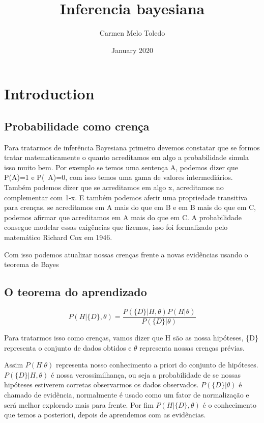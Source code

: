 \documentclass{article}
\title{Inferencia bayesiana}
\author{Carmen Melo Toledo}
\date{January 2020}
\begin{document}
\maketitle

\section{Introduction}

\subsection{Probabilidade como crença}

Para tratarmos de inferência Bayesiana primeiro devemos constatar que se formos tratar matematicamente o quanto acreditamos em algo a probabilidade simula isso muito bem.
Por exemplo se temos uma sentença A, podemos dizer que P(A)=1 e P(~A)=0, com isso temos uma gama de valores intermediários. 
Também podemos dizer que se acreditamos em algo x, acreditamos no complementar com 1-x. E também podemos aferir uma propriedade transitiva para crenças, se acreditamos em A mais do que em B e em B mais do que em C, podemos afirmar que acreditamos em A mais do que em C.
A probabilidade consegue modelar essas exigências que fizemos, isso foi formalizado pelo matemático Richard Cox em 1946.

Com isso podemos atualizar nossas crenças frente a novas evidências usando o teorema de Bayes

\subsection{O teorema do aprendizado}

\begin{equation}
    P(H|\{D\},\theta) = \frac{P(\{D\}|H,\theta) P(H|\theta)}{P(\{D\}|\theta)}
\end{equation}

Para tratarmos isso como crenças, vamos dizer que H são as nossa hipóteses, \{D\} representa o conjunto de dados obtidos e $\theta$ representa nossas crenças prévias.

Assim $P(H|\theta)$ representa nosso conhecimento a priori do conjunto de hipóteses.
$P(\{D\}|H,\theta)$ é nossa verossimilhança, ou seja a probabilidade de se nossas hipóteses estiverem corretas observarmos os dados observados.
$P(\{D\}|\theta)$ é chamado de evidência, normalmente é usado como um fator de normalização e será melhor explorado mais para frente.
Por fim $ P(H|\{D\},\theta)$ é o conhecimento que temos a posteriori, depois de aprendemos com as evidências.
\end{document}
